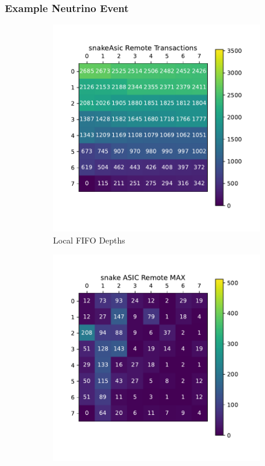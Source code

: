\subsubsection{Example Neutrino Event}

\begin{figure}
\centering
\begin{subfigure}{.5\textwidth}
  \centering
  \includegraphics[width=\textwidth]{images/snake_asic_trans.pdf}
  \caption{Local FIFO Depths}
\end{subfigure}%
\begin{subfigure}{.5\textwidth}
  \centering
  \includegraphics[width=\textwidth]{images/snake_asic_remote.pdf}

\end{subfigure}
\end{figure}
